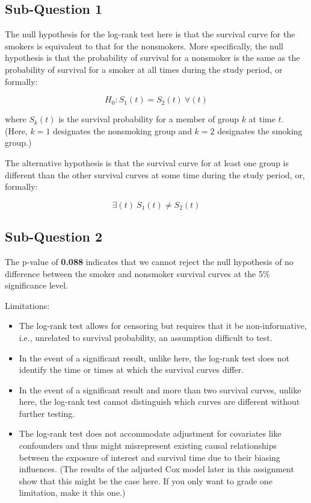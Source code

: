 \documentclass{article}\usepackage[]{graphicx}\usepackage[]{color}
\begin{document}
\fi

\subsection*{Sub-Question 1}

The null hypothesis for the log-rank test here is that the survival curve for the smokers is equivalent to that for the nonsmokers.  More specifically, the null hypothesis is that the probability of survival for a nonsmoker is the same as the probability of survival for a smoker at all times during the study period, or formally:

$$ H_0: S_1(t) = S_2(t) \: \forall(t) $$

where $S_k(t)$ is the survival probability for a member of group $k$ at time $t$.  (Here, $k=1$ designates the nonsmoking group and $k=2$ designates the smoking group.)

\vspace{2mm}

The alternative hypothesis is that the survival curve for at least one group is different than the other survival curves at some time during the study period, or, formally:

$$ \exists (t) \: S_1(t) \neq S_2(t) $$

\subsection*{Sub-Question 2}



The p-value of \textbf{0.088} indicates that we cannot reject the null hypothesis of no difference between the smoker and nonsmoker survival curves at the 5\% significance level.

\vspace{2mm}

Limitations:
\begin{itemize}
  \item The log-rank test allows for censoring but requires that it be non-informative, i.e., unrelated to survival probability, an assumption difficult to test.
  \item In the event of a significant result, unlike here, the log-rank test does not identify the time or times at which the survival curves differ.  
  \item In the event of a significant result and more than two survival curves, unlike here, the log-rank test cannot distinguish which curves are different without further testing.
  \item The log-rank test does not accommodate adjustment for covariates like confounders and thus might misrepresent existing causal relationships between the exposure of interest and survival time due to their biasing influences.  (The results of the adjusted Cox model later in this assignment show that this might be the case here.  If you only want to grade one limitation, make it this one.)
\end{itemize}
\end{document}
